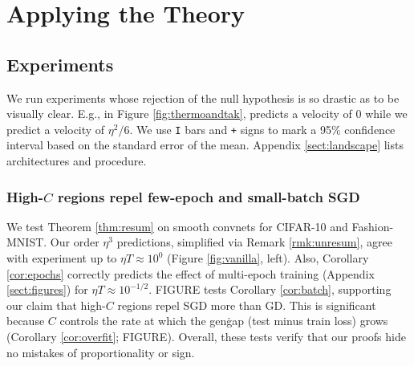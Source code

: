 \documentclass{article}
\theoremstyle{plain}
\theoremstyle{definition}
\begin{document}

\section{Applying the Theory}

\subsection{Experiments}

    We run experiments whose rejection of the null hypothesis is so drastic as
    to be visually clear.  E.g., in Figure \ref{fig:thermoandtak},
    \citep{ch18} predicts a velocity of $0$ while we predict a velocity of
    $\eta^2/6$.  
    We use \texttt{I} bars and \texttt{+} signs to mark a 95\% confidence
    interval based on the standard error of the mean.  Appendix
    \ref{sect:landscape} lists architectures and procedure.

    \subsubsection{High-$C$ regions repel few-epoch and small-batch SGD}
        We test Theorem \ref{thm:resum}  on smooth convnets for CIFAR-10 and
        Fashion-MNIST.  Our order $\eta^3$ predictions, simplified via Remark
        \ref{rmk:unresum}, agree with experiment up to $\eta T \approx 10^0$
        (Figure \ref{fig:vanilla}, left).  Also, Corollary \ref{cor:epochs}
        correctly predicts the effect of multi-epoch training (Appendix
        \ref{sect:figures}) for $\eta T \approx 10^{-1/2}$.
        {\color{red} FIGURE} tests Corollary \ref{cor:batch}, supporting our
        claim that high-$C$ regions repel SGD more than GD.  This is
        significant because $C$ controls the rate at which the gen\. gap (test
        minus train loss) grows (Corollary \ref{cor:overfit}; {\color{red}
        FIGURE}).
        Overall, these tests verify
        that our proofs hide no mistakes of proportionality or sign.  
       
\end{document}
